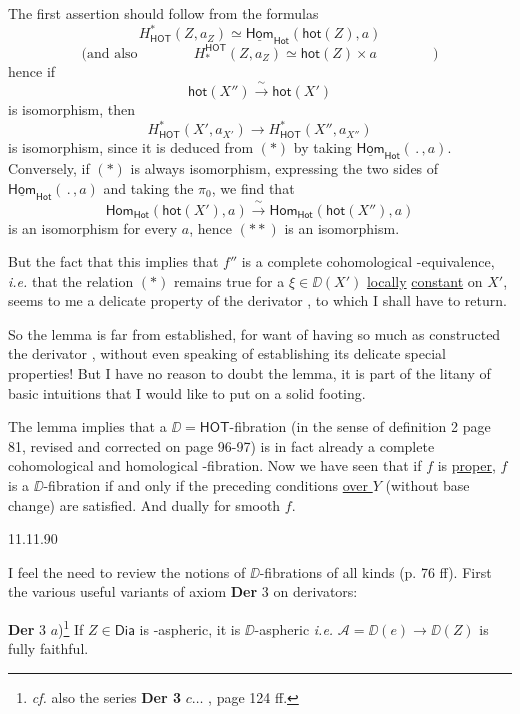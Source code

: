 The first assertion should follow from the formulas
\[ H^{*}_{\mathsf{HOT}}(Z,a_Z) \simeq \underline{\mathsf{Hom}}_{\mathsf{Hot}}(\mathsf{hot}(Z),a) \tag*{$(*)$} \]
\[ \text{(and also} \qquad\qquad H_{*}^{\mathsf{HOT}}(Z,a_Z) \simeq \mathsf{hot}(Z) \times a \qquad\qquad ) \]
hence if
\[ \mathsf{hot}(X'') \xrightarrow{\ \sim\ } \mathsf{hot}(X') \tag*{$(**)$} \]
is isomorphism, then
\[ H^{*}_{\mathsf{HOT}}(X', a_{X'}) \longrightarrow H^{*}_{\mathsf{HOT}}(X'', a_{X''}) \]
is isomorphism, since it is deduced from $(*)$ by taking $\underline{\mathsf{Hom}}_{\mathsf{Hot}}(\,.\,,a)$. Conversely, if $(*)$ is always isomorphism, expressing the two sides of $\underline{\mathsf{Hom}}_{\mathsf{Hot}}(\,.\,,a)$ and taking the $\pi_0$, we find that
\[ \mathsf{Hom}_{\mathsf{Hot}}(\mathsf{hot}(X'),a) \xrightarrow{\ \sim\ } \mathsf{Hom}_{\mathsf{Hot}}(\mathsf{hot}(X''),a) \]
is an isomorphism for every $a$, hence $(**)$ is an isomorphism.

But the fact that this implies that $f''$ is a complete cohomological \HOT-equivalence, \textit{i.e.} that the relation $(*)$ remains true for a $\xi \in \DD(X')$ \underline{locally} \underline{constant} on $X'$, seems to me a delicate property of the derivator \HOT, to which I shall have to return.

So the lemma is far from established, for want of having so much as constructed the derivator \HOT, without even speaking of establishing its delicate special properties! But I have no reason to doubt the lemma, it is part of the litany of basic intuitions that I would like to put on a solid footing.



The lemma implies that a $\DD = \mathsf{HOT}$-fibration (in the sense of definition 2 page 81, revised and corrected on page 96-97) is in fact already a complete cohomological and homological \HOT-fibration. Now we have seen that if $f$ is \underline{proper}, $f$ is a $\DD$-fibration if and only if the preceding conditions \underline{over $Y$} (without base change) are satisfied. And dually for smooth $f$.

\begin{flushright}
11.11.90
\end{flushright}

I feel the need to review the notions of $\DD$-fibrations of all kinds (p. 76 ff). First the various useful variants of axiom \textbf{Der} 3 on derivators:

\textbf{Der} 3 $a$)\footnote[58]{\textit{cf.} also the series \textbf{Der 3} $c \ldots$ , page 124 ff.} If $Z \in \mathsf{Dia}$ is \Hot-aspheric, it is $\DD$-aspheric \textit{i.e.} $\mathcal{A} = \DD(e) \to \DD(Z)$ is fully faithful. %


